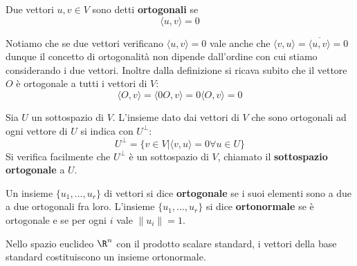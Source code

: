 \begin{definition}
	Due vettori $u, v \in V$ sono detti \textbf{ortogonali} se
	\[
		\langle u, v \rangle = 0
	\]
\end{definition}

Notiamo che se due vettori verificano $\langle u, v \rangle = 0$ vale anche che
$\langle v, u \rangle = \overline{\langle u, v \rangle} = 0$ dunque il concetto
di ortogonalità non dipende dall'ordine con cui stiamo considerando i due
vettori. Inoltre dalla definizione si ricava subito che il vettore $O$ è
ortogonale a tutti i vettori di $V$:
\[
	\langle O, v \rangle = \langle 0O, v \rangle = 0\langle O, v \rangle = 0
\]

\begin{definition}
	Sia $U$ un sottospazio di $V$. L'insieme dato dai vettori di $V$ che sono
	ortogonali ad ogni vettore di $U$ si indica con $U^{\perp}$:
	\[
		U^{\perp} = \{v \in V | \langle v, u \rangle = 0 \forall u \in U\}
	\]
	Si verifica facilmente che $U^{\perp}$ è un sottospazio di $V$, chiamato
	il \textbf{sottospazio ortogonale} a $U$.
\end{definition}

\begin{definition}
	Un insieme $\{u_1, \dots, u_r\}$ di vettori si dice \textbf{ortogonale} se
	i suoi elementi sono a due a due ortogonali fra loro. L'insieme
	$\{u_1, \dots, u_r\}$ si dice \textbf{ortonormale} se è ortogonale e se
	per ogni $i$ vale $\| u_i \| = 1$.
\end{definition}

\begin{example}
	Nello spazio euclideo $\R^n$ con il prodotto scalare standard,
	i vettori della base standard costituiscono un insieme ortonormale.
\end{example}

